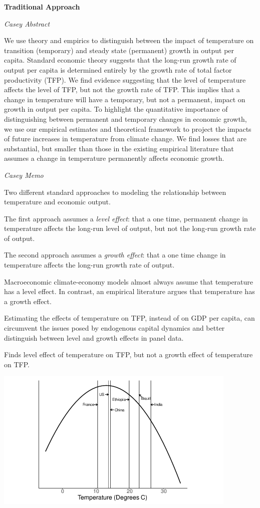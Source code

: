 \documentclass[
]{book}
\begin{document}
\textbf{Traditional Approach}

\emph{Casey Abstract}

We use theory and empirics to distinguish between the impact of temperature
on transition (temporary) and steady state (permanent) growth in output
per capita. Standard economic theory suggests that the long-run growth rate
of output per capita is determined entirely by the growth rate of total factor
productivity (TFP). We find evidence suggesting that the level of temperature
affects the level of TFP, but not the growth rate of TFP. This implies that
a change in temperature will have a temporary, but not a permanent, impact
on growth in output per capita. To highlight the quantitative importance of
distinguishing between permanent and temporary changes in economic growth,
we use our empirical estimates and theoretical framework to project the impacts
of future increases in temperature from climate change. We find losses
that are substantial, but smaller than those in the existing empirical literature
that assumes a change in temperature permanently affects economic growth.

\emph{Casey Memo}

Two different standard approaches to modeling the relationship between temperature
and economic output.

The first approach assumes a \emph{level effect}: that a one time, permanent change in
temperature affects the long-run level of output,
but not the long-run growth rate of output.

The second approach assumes a \emph{growth effect}: that a one time
change in temperature affects the long-run growth rate of output.

Macroeconomic climate-economy models almost always assume that temperature
has a level effect.
In contrast, an empirical literature argues that temperature has a growth
effect.

Estimating the
effects of temperature on TFP, instead of on GDP per capita, can circumvent the
issues posed by endogenous capital dynamics and better distinguish between level
and growth effects in panel data.

Finds level effect of temperature on TFP, but not a growth effect of temperature on TFP.

\includegraphics{fig/casey_temp_tpf.png}
\end{document}
